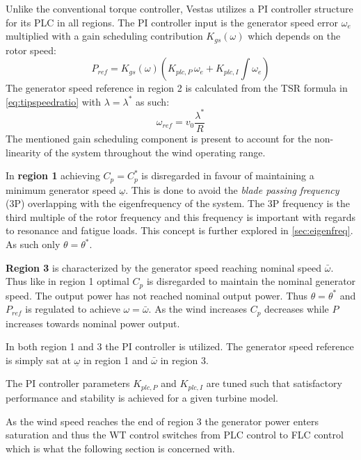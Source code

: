 \medskip
Unlike the conventional torque controller, Vestas utilizes a PI controller structure for its PLC in all regions. The PI controller input is the generator speed error $ \omega_e $ multiplied with a gain scheduling contribution $ K_{gs}(\omega) $ which depends on the rotor speed:
\begin{equation}\label{eq:pi_plc_ctrl}
	P_{ref} = K_{gs}(\omega) \left(K_{plc,P} \, \omega_e + K_{plc,I} \int \omega_e\right)
\end{equation}
The generator speed reference in region 2 is calculated from the TSR formula in \cref{eq:tipspeedratio} with $ \lambda = \lambda^* $ as such:
\begin{equation}\label{eq:omega_ref_from_tsr}
	\omega_{ref} = v_0 \dfrac{\lambda^*}{R}
\end{equation} 
The mentioned gain scheduling component is present to account for the non-linearity of the system throughout the wind operating range.

In \textbf{region 1} achieving $ C_p = C_p^* $ is disregarded in favour of maintaining a minimum generator speed $ \underline{\omega} $. This is done to avoid the \textit{blade passing frequency} (3P) overlapping with the eigenfrequency of the system. The 3P frequency is the third multiple of the rotor frequency and this frequency is important with regards to resonance and fatigue loads. This concept is further explored in \cref{sec:eigenfreq}. As such only $ \theta = \theta^* $.

\textbf{Region 3} is characterized by the generator speed reaching nominal speed $ \bar{\omega} $. Thus like in region 1 optimal $ C_p $ is disregarded to maintain the nominal generator speed. The output power has not reached nominal output power. Thus $ \theta = \theta^* $ and $ P_{ref} $ is regulated to achieve $ \omega = \bar{\omega} $. As the wind increases $ C_p $ decreases while $ P $ increases towards nominal power output. 

In both region 1 and 3 the PI controller is utilized. The generator speed reference is simply sat at $ \underline{\omega} $ in region 1 and $ \bar{\omega} $ in region 3.

The PI controller parameters $ K_{plc,P} $ and $ K_{plc,I} $ are tuned such that satisfactory performance and stability is achieved for a given turbine model. 

As the wind speed reaches the end of region 3 the generator power enters saturation and thus the WT control switches from PLC control to FLC control which is what the following section is concerned with.


